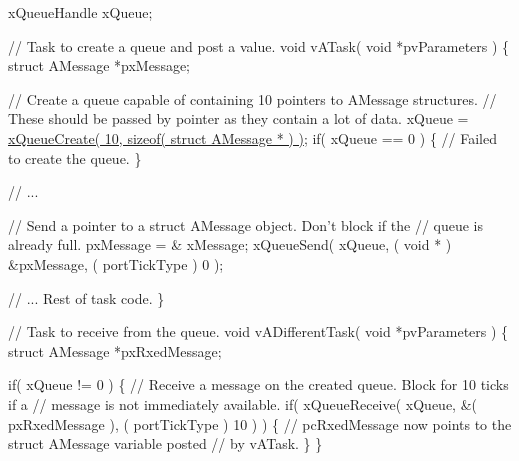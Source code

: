 \begin{DoxyPre}xQueueHandle xQueue;\end{DoxyPre}



\begin{DoxyPre}// Task to create a queue and post a value.
void vATask( void *pvParameters )
\{
struct AMessage *pxMessage;\end{DoxyPre}



\begin{DoxyPre}   // Create a queue capable of containing 10 pointers to AMessage structures.
   // These should be passed by pointer as they contain a lot of data.
   xQueue = \hyperlink{queue_8h_aeb858b824bd74a934ea7ebb81af2a6bb}{xQueueCreate( 10, sizeof( struct AMessage * ) )};
   if( xQueue == 0 )
   \{
    // Failed to create the queue.
   \}\end{DoxyPre}



\begin{DoxyPre}   // ...\end{DoxyPre}



\begin{DoxyPre}   // Send a pointer to a struct AMessage object.  Don't block if the
   // queue is already full.
   pxMessage = \& xMessage;
   xQueueSend( xQueue, ( void * ) \&pxMessage, ( portTickType ) 0 );\end{DoxyPre}



\begin{DoxyPre}   // ... Rest of task code.
\}\end{DoxyPre}



\begin{DoxyPre}// Task to receive from the queue.
void vADifferentTask( void *pvParameters )
\{
struct AMessage *pxRxedMessage;\end{DoxyPre}



\begin{DoxyPre}   if( xQueue != 0 )
   \{
    // Receive a message on the created queue.  Block for 10 ticks if a
    // message is not immediately available.
    if( xQueueReceive( xQueue, \&( pxRxedMessage ), ( portTickType ) 10 ) )
    \{
        // pcRxedMessage now points to the struct AMessage variable posted
        // by vATask.
    \}
   \}\end{DoxyPre}



